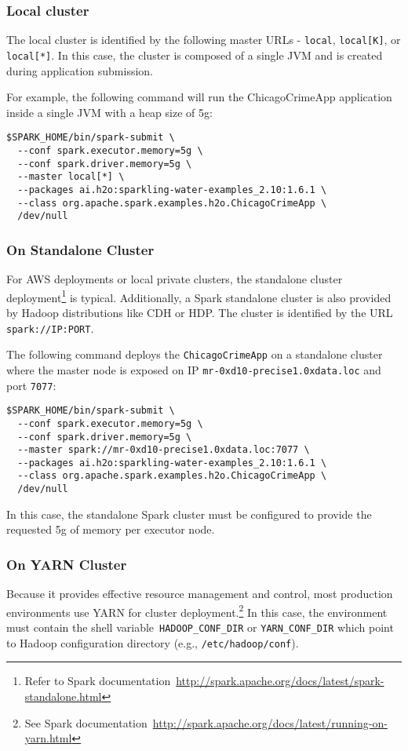 \subsubsection{Local cluster}
The local cluster is identified by the following master URLs - \texttt{local}, \texttt{local[K]}, or \texttt{local[*]}. In this case, the cluster is composed of a single JVM and is created during application submission.

For example, the following command will run the ChicagoCrimeApp application inside a single JVM with a heap size of 5g:
\begin{lstlisting}[style=Bash]
$SPARK_HOME/bin/spark-submit \ 
  --conf spark.executor.memory=5g \
  --conf spark.driver.memory=5g \
  --master local[*] \
  --packages ai.h2o:sparkling-water-examples_2.10:1.6.1 \
  --class org.apache.spark.examples.h2o.ChicagoCrimeApp \
  /dev/null
\end{lstlisting}

\subsubsection{On Standalone Cluster}
For AWS deployments or local private clusters, the standalone cluster deployment\footnote{Refer to Spark documentation~\url{http://spark.apache.org/docs/latest/spark-standalone.html}} is typical. Additionally, a Spark standalone cluster is also provided by Hadoop distributions like CDH or HDP. The cluster is identified by the URL \texttt{spark://IP:PORT}.

The following command deploys the \texttt{ChicagoCrimeApp} on a standalone cluster where the master node is exposed on IP \texttt{mr-0xd10-precise1.0xdata.loc} and port \texttt{7077}:

\begin{lstlisting}[style=Bash]
$SPARK_HOME/bin/spark-submit \ 
  --conf spark.executor.memory=5g \
  --conf spark.driver.memory=5g \
  --master spark://mr-0xd10-precise1.0xdata.loc:7077 \
  --packages ai.h2o:sparkling-water-examples_2.10:1.6.1 \
  --class org.apache.spark.examples.h2o.ChicagoCrimeApp \
  /dev/null
\end{lstlisting}

In this case, the standalone Spark cluster must be configured to provide the requested 5g of memory per executor node. 

\subsubsection{On YARN Cluster}
Because it provides effective resource management and control, most production environments use YARN for cluster deployment.\footnote{See Spark documentation~\url{http://spark.apache.org/docs/latest/running-on-yarn.html}} 
In this case, the environment must contain the shell variable~\texttt{HADOOP\_CONF\_DIR} or \texttt{YARN\_CONF\_DIR} which point to Hadoop configuration directory (e.g., \texttt{/etc/hadoop/conf}).

